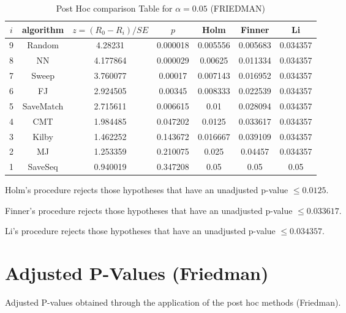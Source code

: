 \documentclass[a4paper,10pt]{article}
\begin{document}
\begin{landscape}
\begin{table}[!htp]
\centering\footnotesize
\begin{tabular}{ccccccc}
$i$&algorithm&$z=(R_0 - R_i)/SE$&$p$&Holm &Finner&Li\\
\hline9&Random&4.28231&0.000018&0.005556&0.005683&0.034357\\8&NN&4.177864&0.000029&0.00625&0.011334&0.034357\\7&Sweep&3.760077&0.00017&0.007143&0.016952&0.034357\\6&FJ&2.924505&0.00345&0.008333&0.022539&0.034357\\5&SaveMatch&2.715611&0.006615&0.01&0.028094&0.034357\\4&CMT&1.984485&0.047202&0.0125&0.033617&0.034357\\3&Kilby&1.462252&0.143672&0.016667&0.039109&0.034357\\2&MJ&1.253359&0.210075&0.025&0.04457&0.034357\\1&SaveSeq&0.940019&0.347208&0.05&0.05&0.05\\\hline
\end{tabular}
\caption{Post Hoc comparison Table for $\alpha=0.05$ (FRIEDMAN)}
\end{table}Holm's procedure rejects those hypotheses that have an unadjusted p-value $\le0.0125$.

Finner's procedure rejects those hypotheses that have an unadjusted p-value $\le0.033617$.

Li's procedure rejects those hypotheses that have an unadjusted p-value $\le0.034357$.


\newpage

\section{Adjusted P-Values (Friedman)}


Adjusted P-values obtained through the application of the post hoc methods (Friedman).


\end{landscape}
\end{document}
